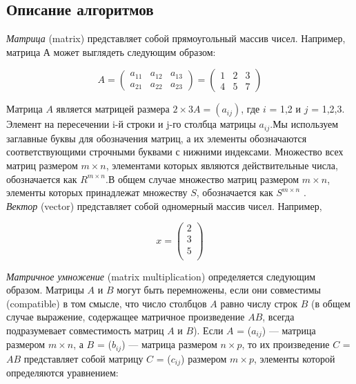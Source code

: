 \documentclass[a4paper,12pt]{article}
\begin{document}
\subsection{Описание алгоритмов}
\textit{Матрица} (matrix) представляет собой прямоугольный массив чисел.
Например, матрица А может выглядеть следующим образом:
\begin{center}
\begin{equation}
A = \left(
\begin{array}{lll}
a_{11} & a_{12} & a_{13} \\
a_{21} & a_{22} & a_{23}
\end{array}
\right) = \left(
\begin{array}{lll}
1 & 2 & 3 \\
4 & 5 & 7
\end{array}
\right)
\end{equation}
\end{center}
Матрица $A$ является матрицей размера $2 × 3 A = (a_{ij})$, где $i$ = 1,2 и $j$ = 1,2,3. Элемент на пересечении i-й строки и j-го столбца матрицы $a_{ij}$.Мы используем заглавные буквы для обозначения матриц, а их элементы обозначаются соответствующими строчными буквами с нижними индексами. Множество всех матриц размером $m×n$, элементами которых являются действительные числа, обозначается как $R^{m×n}$.В общем случае множество матриц размером $m × n$, элементы которых принадлежат множеству $S$, обозначается как $S^{m×n}$ .\\
\textit{Вектор} (vector) представляет собой одномерный массив чисел. Например,
\begin{center}
\begin{equation}
x = \left(
\begin{matrix}
2 \\
3 \\
5 \\
\end{matrix}
\right)
\end{equation}
\end{center}
\textit{Матричное умножение} (matrix multiplication) определяется следующим образом. Матрицы $A$ и $B$ могут быть перемножены, если они совместимы (compatible) в том смысле, что число столбцов $A$ равно числу строк $B$ (в общем случае выражение, содержащее матричное произведение $AB$, всегда подразумевает совместимость матриц $A$ и $B$). Если $A$ = ($a_{ij}$) — матрица размером $m × n$, а $B$ = ($b_{ij}$) — матрица размером $n × p$, то их произведение $C$ = $AB$ представляет собой матрицу $C$ = ($c_{ij}$) размером $m × p$, элементы которой определяются уравнением:
\end{document}
